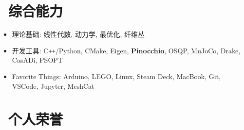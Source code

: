 \documentclass{resume}
\begin{document}
\section{\faCogs\ 综合能力}
\begin{itemize}[parsep=0.5ex]
  \item 理论基础: 线性代数, 动力学, 最优化, 纤维丛%
  \item 开发工具: C\texttt{++}/Python, CMake, Eigen, \textbf{Pinocchio}, {OSQP}, {MuJoCo}, {Drake}, CasADi, PSOPT
  \item Favorite Things: Arduino, LEGO, Linux, Steam Deck, MacBook, Git, VSCode, Jupyter, MeshCat
\end{itemize}

\section{\faHeartO\ 个人荣誉}
\end{document}
